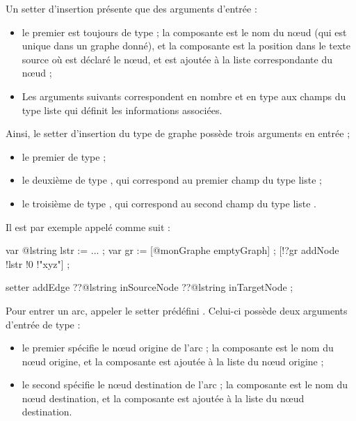 Un setter d'insertion présente que des arguments d'entrée :
\begin{itemize}
  \item le premier est toujours de type  ; la composante  est le nom du nœud (qui est unique dans un graphe donné), et la composante  est la position dans le texte source où est déclaré le nœud, et est ajoutée à la liste correspondante du nœud ;
  \item Les arguments suivants correspondent en nombre et en type aux champs du type liste qui définit les informations associées.
\end{itemize}

Ainsi, le setter d'insertion  du type de graphe  possède trois arguments en entrée ;
\begin{itemize}
  \item le premier de type  ;
  \item le deuxième de type , qui correspond au premier champ  du type liste  ;
  \item le troisième de type , qui correspond au second champ  du type liste .
\end{itemize}

Il est par exemple appelé comme suit :
\begin{galgascode}
var @lstring lstr := ... ;
var gr := [@monGraphe emptyGraph] ;
[!?gr addNode !lstr !0 !"xyz"] ;
\end{galgascode}





\begin{galgascode}
setter addEdge ??@lstring inSourceNode ??@lstring inTargetNode ;
\end{galgascode}

Pour entrer un arc, appeler le setter prédéfini . Celui-ci possède deux arguments d'entrée de type  :
\begin{itemize}
  \item le premier spécifie le nœud origine de l'arc ; la composante  est le nom du nœud origine, et la composante  est ajoutée à la liste du nœud origine ;
  \item le second spécifie le nœud destination de l'arc ; la composante  est le nom du nœud destination, et la composante  est ajoutée à la liste du nœud destination.
\end{itemize}







